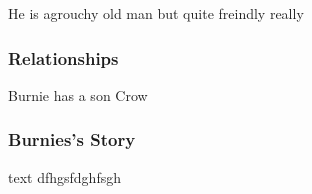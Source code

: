 He is agrouchy old man but quite freindly really

\subsubsection{Relationships}

Burnie has a son Crow

\subsubsection{Burnies's Story}



\begin{DndSidebar}{text}
 dfhgsfdghfsgh
\end{DndSidebar}

\smallskip

\bigskip


\clearpage